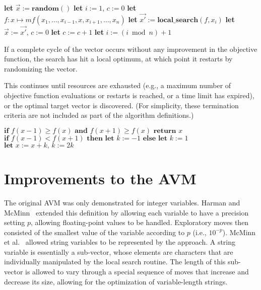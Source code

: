 \documentclass{llncs}
\newcommand{\inlineheading}[1]{\vspace{1ex} \noindent {\bf #1.}}
\newcommand{\mf}{\mathit{mf}}
\begin{document}
\begin{algorithm}
	\small
		\caption{The main loop of the AVM for optimizing $\vec{x} = (x_1, \dots, x_n)$ %
		}
	\begin{algorithmic}[1]
			\STATE \textbf{let} $\vec{x}:=\mathbf{random}()$
			\STATE \textbf{let} $i:=1$, $c:=0$
				\STATE \textbf{let} $f \colon x \mapsto \mf(x_1, \dots, x_{i-1}, x, x_{i+1}, \dots, x_n)$
				\STATE \textbf{let} $\vec{x'}:=\mathbf{local\_search}(f,x_i)$
				 \IF{$\mf(\vec{x'})<\mf(\vec{x})$}
					\STATE \textbf{let} $\vec{x}:=\vec{x'}$, $c:=0$
				\ELSE
					\STATE \textbf{let} $c:=c+1$
				\ENDIF
				\STATE \textbf{let} $i:= (i \bmod n) +1$
			\ENDWHILE
		\ENDWHILE
	\end{algorithmic}
	\label{alg:basic}
\end{algorithm}

If a complete cycle of the vector occurs without any improvement in the objective function, the search has hit a local optimum, at which point it restarts by randomizing the vector.

This continues until resources are exhausted (e.g., a maximum number of objective function evaluations or restarts is reached, or a time limit has expired), or the optimal target vector is discovered. (For simplicity, these termination criteria are not included as part of the algorithm definitions.)

\begin{algorithm}
	\small
	\caption{$\text{Iterated Pattern Search, starting at }x\in D$}
	\begin{algorithmic}[1]
			\STATE$\textbf{if }f(x-1)\geq f(x)\textbf{ and }f(x+1)\geq f(x)\textbf{ return }x$
			\STATE$\textbf{if }f(x-1)<f(x+1)\textbf{ then let }k:=-1\textbf{ else let }k:=1$
				\STATE$\textbf{let }x:=x+k\text{, }k:=2k$
			\ENDWHILE
		\ENDWHILE
	\end{algorithmic}
	\vspace*{1mm}
	\label{alg:ips}
\end{algorithm}

\section{Improvements to the AVM}
\label{sec:improvements}

\inlineheading{Representations}
The original AVM was only demonstrated for integer variables. Harman and McMinn~\cite{Harman2007} extended this definition by allowing each variable to have a precision setting $p$, allowing floating-point values to be handled. Exploratory moves then consisted of the smallest value of the variable according to $p$ (i.e., $10^{-p}$). McMinn et al.~\cite{McMinn2015} allowed string variables to be represented by the approach. A string variable is essentially a sub-vector, whose elements are characters that are individually manipulated by the local search routine. The length of this sub-vector is allowed to vary through a special sequence of moves that increase and decrease its size, allowing for the optimization of variable-length strings.
\end{document}
